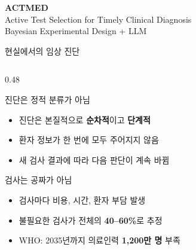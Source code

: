 \documentclass[
11pt,notheorems,hyperref={pdfauthor=whatever}
]{beamer}
\begin{document}
\begin{frame}[plain]
    \centering
    \vspace{2.0cm}
    {\Large\bfseries ACTMED}\\[0.8em]
    {\normalsize Active Test Selection for Timely Clinical Diagnosis}\\[0.5em]
    {\footnotesize Bayesian Experimental Design + LLM}
\end{frame}

\begin{frame}{현실에서의 임상 진단}
\begin{columns}[c]

\begin{column}{0.48\textwidth}
    \begin{block}{진단은 정적 분류가 아님}
    \begin{itemize}\itemsep0.4em
        \item 진단은 본질적으로 \textbf{순차적}이고 \textbf{단계적}
        \item 환자 정보가 한 번에 모두 주어지지 않음
        \item 새 검사 결과에 따라 다음 판단이 계속 바뀜
    \end{itemize}
    \end{block}

    \vspace{0.4em}

    \begin{block}{검사는 공짜가 아님}
    \begin{itemize}\itemsep0.4em
        \item 검사마다 비용, 시간, 환자 부담 발생
        \item 불필요한 검사가 전체의 \textbf{40--60\%}로 추정
        \item WHO: 2035년까지 의료인력 \textbf{1,200만 명} 부족
    \end{itemize}
    \end{block}
\end{column}


\end{columns}
\end{frame}
\end{document}
